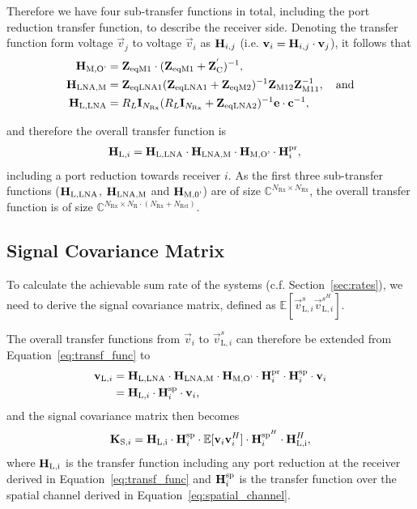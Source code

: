 Therefore we have four sub-transfer functions in total, including the port reduction transfer function, to describe the receiver side.
Denoting the transfer function form voltage $\vec{v}_j$ to voltage $\vec{v}_i$ as $\mathbf{H}_{i,j}$ (i.e. $\mathbf{v}_i = \mathbf{H}_{i,j} \cdot\mathbf{v}_j$), it follows that
\begin{align}
\mathbf{H}_\text{M,O'} &= \mathbf{Z}_\text{eqM1}\cdot(\mathbf{Z}_\text{eqM1} + \mathbf{Z}_\text{C}^{'})^{-1}, \\
\mathbf{H}_\text{LNA,M} &= \mathbf{Z}_\text{eqLNA1}(\mathbf{Z}_\text{eqLNA1}+\mathbf{Z}_\text{eqM2})^{-1}\mathbf{Z}_\text{M12} \mathbf{Z}_\text{M11}^{-1},\quad\text{and}\\
\mathbf{H}_\text{L,LNA} &= R_L\mathbf{I}_{N_\text{Rx}}(R_L\mathbf{I}_{N_\text{Rx}}+\mathbf{Z}_\text{eqLNA2})^{-1}\mathbf{e}\cdot\mathbf{c}^{-1},
\end{align}

and therefore the overall transfer function is
\begin{align}
\label{eq:transf_func}
\mathbf{H}_{\text{L},i} &= 
	\mathbf{H}_\text{L,LNA}\cdot\mathbf{H}_\text{LNA,M}\cdot\mathbf{H}_\text{M,O'}\cdot\mathbf{H}_i^\text{pr},
\end{align}
including a port reduction towards receiver $i$.
As the first three sub-transfer functions ($\mathbf{H}_\text{L,LNA}$, $\mathbf{H}_\text{LNA,M}$ and $\mathbf{H}_\text{M,0'}$) are of size
$\mathbb{C}^{N_\text{Rx}\times N_\text{Rx}}$, the overall transfer function is of size
$\mathbb{C}^{N_\text{Rx}\times N_\text{R}\cdot\left(N_\text{Rx}+N_\text{Rel}\right)}$.
	


\subsection{Signal Covariance Matrix}
\label{sec:sig_cov}
To calculate the achievable sum rate of the systems (c.f. Section~\ref{sec:rates}), we need to derive the signal covariance matrix, defined as $\mathbb{E}[\vec{v}_{\text{L},i}^s\vec{v}_{\text{L},i}^{s^H}]$.

The overall transfer functions from $\vec{v}_i$ to $\vec{v}_{\text{L},i}^s$ can therefore be extended from Equation~\eqref{eq:transf_func} to
\begin{align}
\label{eq:transfer_function}
 \mathbf{v}_{\text{L},i}&= \mathbf{H}_\text{L,LNA}\cdot\mathbf{H}_\text{LNA,M}\cdot\mathbf{H}_\text{M,O'}
		\cdot \mathbf{H}_i^{\text{pr}}\cdot\mathbf{H}_{i}^{\text{sp}} \cdot\mathbf{v}_i\\\nonumber
 &=\mathbf{H}_{\text{L,}i}\cdot \mathbf{H}_{i}^{\text{sp}}\cdot\mathbf{v}_i,
\end{align}
and the signal covariance matrix then becomes
\begin{equation}
\label{eq:sig_cov}
\mat{K}_{\text{S},i}=%
	\mat{H}_\text{L,i}\cdot \mat{H}_{i}^{\text{sp}}
	\cdot\mathbb{E}[\vec{v}_i\vec{v}_i^H]\cdot
	\mat{H}_{i}^{\text{sp}^H} \cdot \mat{H}_\text{L,i}^H,
\end{equation}
where $\mathbf{H}_\text{L,i}$ is the transfer function including any port reduction at the receiver derived in Equation~\eqref{eq:transf_func} and $\mathbf{H}_{i}^{\text{sp}}$ is the transfer function over the spatial channel derived in Equation~\eqref{eq:spatial_channel}.

